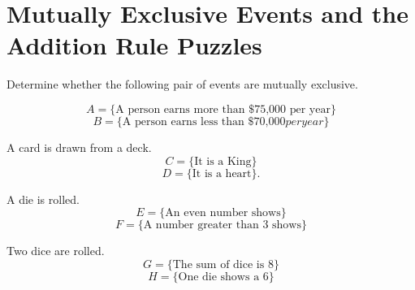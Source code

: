 \section{Mutually Exclusive Events and the Addition Rule Puzzles}

Determine whether the following pair of events are mutually exclusive.
\begin{puzzle}
    \[ A = \{\text{A person earns more than \$75,000 per year}\}\]
    \[B = \{\text{A person earns less than \$70,000} per year\}\]
\end{puzzle}

\begin{puzzle}
    A card is drawn from a deck.
    \[ C = \{\text{It is a King}\}\]
    \[D = \{\text{It is a heart}\}.\]
\end{puzzle}

\begin{puzzle}
    A die is rolled.
    \[ E = \{\text{An even number shows}\}\]
    \[F = \{\text{A number greater than 3 shows}\}\]
\end{puzzle}

\begin{puzzle}
    Two dice are rolled.
    \[ G = \{\text{The sum of dice is 8}\}\]
    \[H = \{\text{One die shows a 6}\}\]
\end{puzzle}


